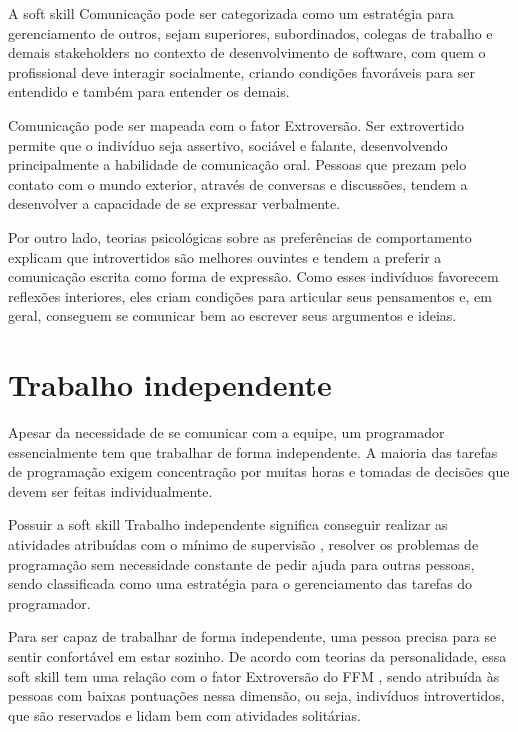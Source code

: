 A soft skill Comunicação pode ser categorizada como um estratégia para gerenciamento de outros, sejam superiores, subordinados, colegas de trabalho e demais stakeholders no contexto de desenvolvimento de software, com quem o profissional deve interagir socialmente, criando condições favoráveis para ser entendido e também para entender os demais.

Comunicação pode ser mapeada com o fator Extroversão. Ser extrovertido permite que o indivíduo seja assertivo, sociável e falante, desenvolvendo principalmente a habilidade de comunicação oral. Pessoas que prezam pelo contato com o mundo exterior, através de conversas e discussões, tendem a desenvolver a capacidade de se expressar verbalmente.

Por outro lado, teorias psicológicas sobre as preferências de comportamento \cite{myers:98} explicam que introvertidos são melhores ouvintes e tendem a preferir a comunicação escrita como forma de expressão. Como esses indivíduos favorecem reflexões interiores, eles criam condições para articular seus pensamentos e, em geral, conseguem se comunicar bem ao escrever seus argumentos e ideias.

\section{Trabalho independente}

Apesar da necessidade de se comunicar com a equipe, um programador essencialmente tem que trabalhar de forma independente. A maioria das tarefas de programação exigem concentração por muitas horas e tomadas de decisões que devem ser feitas individualmente.

Possuir a soft skill Trabalho independente significa conseguir realizar as atividades atribuídas com o mínimo de supervisão \cite{ahmed:12}, resolver os problemas de programação sem necessidade constante de pedir ajuda para outras pessoas, sendo classificada como uma estratégia para o gerenciamento das tarefas do programador.

Para ser capaz de trabalhar de forma independente, uma pessoa precisa para se sentir confortável em estar sozinho. De acordo com teorias da personalidade, essa soft skill tem uma relação com o fator Extroversão do FFM \cite{rehman:12}, sendo atribuída às pessoas com baixas pontuações nessa dimensão, ou seja, indivíduos introvertidos, que são reservados e lidam bem com atividades solitárias.

